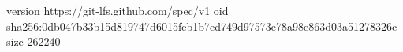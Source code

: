 version https://git-lfs.github.com/spec/v1
oid sha256:0db047b33b15d819747d6015feb1b7ed749d97573e78a98e863d03a51278326c
size 262240
